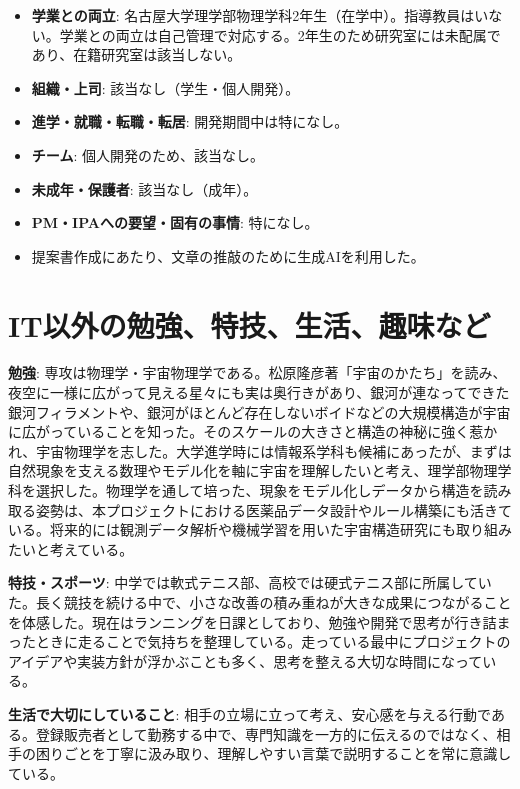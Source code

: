 \documentclass[11pt,a4paper,ja=minimal,xelatex]{bxjsarticle}
\begin{document}
\begin{itemize}[nosep]
\item \textbf{学業との両立}: 名古屋大学理学部物理学科2年生（在学中）。指導教員はいない。学業との両立は自己管理で対応する。2年生のため研究室には未配属であり、在籍研究室は該当しない。
\item \textbf{組織・上司}: 該当なし（学生・個人開発）。
\item \textbf{進学・就職・転職・転居}: 開発期間中は特になし。
\item \textbf{チーム}: 個人開発のため、該当なし。
\item \textbf{未成年・保護者}: 該当なし（成年）。
\item \textbf{PM・IPAへの要望・固有の事情}: 特になし。
\item 提案書作成にあたり、文章の推敲のために生成AIを利用した。
\end{itemize}

\section*{ IT以外の勉強、特技、生活、趣味など}

\textbf{勉強}: 専攻は物理学・宇宙物理学である。松原隆彦著「宇宙のかたち」を読み、夜空に一様に広がって見える星々にも実は奥行きがあり、銀河が連なってできた銀河フィラメントや、銀河がほとんど存在しないボイドなどの大規模構造が宇宙に広がっていることを知った。そのスケールの大きさと構造の神秘に強く惹かれ、宇宙物理学を志した。大学進学時には情報系学科も候補にあったが、まずは自然現象を支える数理やモデル化を軸に宇宙を理解したいと考え、理学部物理学科を選択した。物理学を通して培った、現象をモデル化しデータから構造を読み取る姿勢は、本プロジェクトにおける医薬品データ設計やルール構築にも活きている。将来的には観測データ解析や機械学習を用いた宇宙構造研究にも取り組みたいと考えている。

\textbf{特技・スポーツ}: 中学では軟式テニス部、高校では硬式テニス部に所属していた。長く競技を続ける中で、小さな改善の積み重ねが大きな成果につながることを体感した。現在はランニングを日課としており、勉強や開発で思考が行き詰まったときに走ることで気持ちを整理している。走っている最中にプロジェクトのアイデアや実装方針が浮かぶことも多く、思考を整える大切な時間になっている。

\textbf{生活で大切にしていること}: 相手の立場に立って考え、安心感を与える行動である。登録販売者として勤務する中で、専門知識を一方的に伝えるのではなく、相手の困りごとを丁寧に汲み取り、理解しやすい言葉で説明することを常に意識している。
\end{document}
